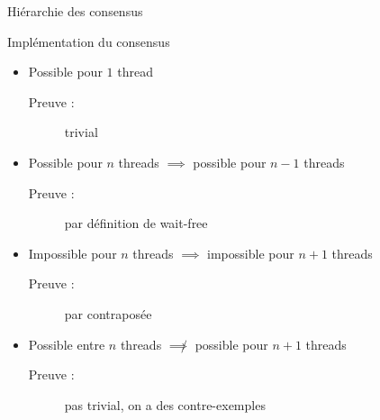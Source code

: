 
\begingroup

\begin{frame}{Hiérarchie des consensus}
  \begin{block}{Implémentation du consensus}
    \begin{itemize}
    \item Possible pour $1$ thread
      \begin{description}
      \item[Preuve :] trivial
      \end{description}
    \item Possible pour $n$ threads $\implies$ possible pour $n-1$ threads
      \begin{description}
      \item[Preuve :] par définition de wait-free
      \end{description}
    \item Impossible pour $n$ threads $\implies$ impossible pour $n+1$ threads
      \begin{description}
      \item[Preuve :] par contraposée
      \end{description}
    \item Possible entre $n$ threads $\not\implies$ possible pour $n+1$ threads
      \begin{description}
      \item[\alert{Preuve :}] pas trivial, on a des contre-exemples
      \end{description}
    \end{itemize}
  \end{block}
  \medskip
\end{frame}

\endgroup
\endinput
